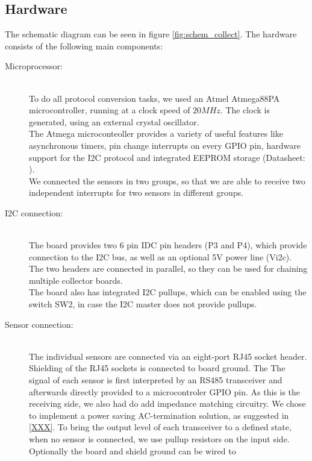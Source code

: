 \documentclass[a4paper]{scrreprt}
\begin{document}
\subsection{Hardware}
The schematic diagram can be seen in figure \ref{fig:schem_collect}. The hardware consists of the following main components:
\begin{description}
  \item[Microprocessor:]\hspace{1cm}\\
    To do all protocol conversion tasks, we used an Atmel Atmega88PA
    microcontroller, running at a clock speed of $20MHz$. The clock
    is generated, using an external crystal oscillator.\\
    The Atmega microconteoller provides a variety of useful features
    like asynchronous timers, pin change interrupts on every GPIO
    pin, hardware support for the I2C protocol and integrated EEPROM
    storage (Datasheet: \cite{atmega88}).\\
    We connected the sensors in two groups, so that we are able to
    receive two independent interrupts for two sensors in different
    groups.
  \item[I2C connection:]\hspace{1cm}\\
    The board provides two 6 pin IDC pin headers (P3 and P4), which
    provide connection to the I2C bus, as well as an optional 5V
    power line (Vi2c). The two headers are connected in parallel,
    so they can be used for chaining multiple collector boards.\\
    The board also has integrated I2C pullups, which can be enabled
    using the switch SW2, in case the I2C master does not provide
    pullups.
  \item[Sensor connection:]\hspace{1cm}\\
    The individual sensors are connected via an eight-port RJ45
    socket header. Shielding of the RJ45 sockets is connected to
    board ground. The The signal of each sensor is first interpreted
    by an RS485 transceiver and afterwards directly provided to a
    microcontroler GPIO pin. As this is the receiving side, we also
    had do add impedance matching circuitry. We chose to implement
    a power saving AC-termination solution, as suggested in \ref{XXX}.
    To bring the output level of each transceiver to a defined state,
    when no sensor is connected, we use pullup resistors on the
    input side. Optionally the board and shield ground can be wired to

\end{description}
\end{document}
